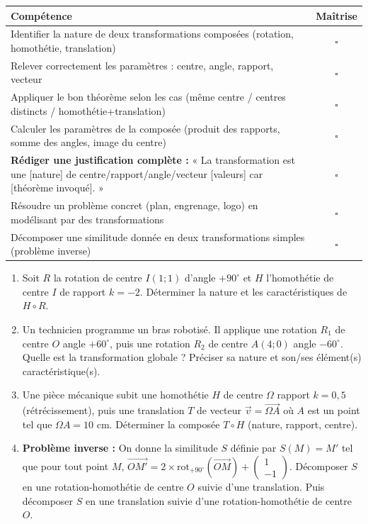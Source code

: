 \documentclass[11pt]{article}
\begin{document}
\begin{aretenir}
\noindent\begin{tabularx}{\linewidth}{|X|c|}
\hline
\textbf{Compétence} & \textbf{Maîtrise} \\
\hline
Identifier la nature de deux transformations composées (rotation, homothétie, translation) & $\square$ \\
Relever correctement les paramètres : centre, angle, rapport, vecteur & $\square$ \\
Appliquer le bon théorème selon les cas (même centre / centres distincts / homothétie+translation) & $\square$ \\
Calculer les paramètres de la composée (produit des rapports, somme des angles, image du centre) & $\square$ \\
\textbf{Rédiger une justification complète :} « La transformation est une [nature] de centre/rapport/angle/vecteur [valeurs] car [théorème invoqué]. » & $\square$ \\
Résoudre un problème concret (plan, engrenage, logo) en modélisant par des transformations & $\square$ \\
Décomposer une similitude donnée en deux transformations simples (problème inverse) & $\square$ \\
\hline
\end{tabularx}
\end{aretenir}

\begin{exercice}
\begin{enumerate}
    \item Soit $R$ la rotation de centre $I(1;1)$ d'angle $+90^\circ$ et $H$ l'homothétie de centre $I$ de rapport $k=-2$. Déterminer la nature et les caractéristiques de $H \circ R$.
    \item Un technicien programme un bras robotisé. Il applique une rotation $R_1$ de centre $O$ angle $+60^\circ$, puis une rotation $R_2$ de centre $A(4;0)$ angle $-60^\circ$. Quelle est la transformation globale ? Préciser sa nature et son/ses élément(s) caractéristique(s).
    \item Une pièce mécanique subit une homothétie $H$ de centre $\Omega$ rapport $k=0,5$ (rétrécissement), puis une translation $T$ de vecteur $\vec{v} = \overrightarrow{\Omega A}$ où $A$ est un point tel que $\Omega A = 10$ cm. Déterminer la composée $T \circ H$ (nature, rapport, centre).
    \item \textbf{Problème inverse :} On donne la similitude $S$ définie par $S(M) = M'$ tel que pour tout point $M$, $\overrightarrow{OM'} = 2 \times \text{rot}_{+90^\circ}(\overrightarrow{OM}) + \begin{pmatrix} 1 \\ -1 \end{pmatrix}$. Décomposer $S$ en une rotation-homothétie de centre $O$ suivie d'une translation. Puis décomposer $S$ en une translation suivie d'une rotation-homothétie de centre $O$.
\end{enumerate}
\end{exercice}
\end{document}
